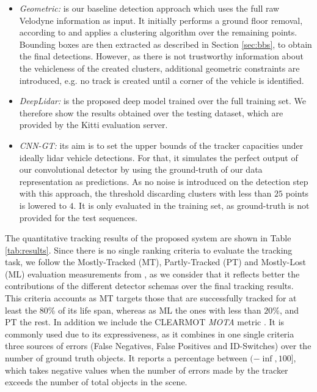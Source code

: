 \documentclass[letterpaper, 10 pt, conference]{ieeeconf}  %
\begin{document}
\begin{itemize}
\item \textit{Geometric:} is our baseline detection approach which uses the full raw Velodyne information as input. It initially performs a ground floor removal, according to \cite{petrovskaya2009model} and applies a clustering algorithm over the remaining points. Bounding boxes are then extracted as described in Section \ref{sec:bbs}, to obtain the final detections. However, as there is not trustworthy information about the vehicleness of the created clusters, additional geometric constraints are introduced, e.g. no track is created until a corner of the vehicle is identified.

\item \textit{DeepLidar:} is the proposed deep model trained over the full training set. We therefore show the results obtained over the testing dataset, which are provided by the Kitti evaluation server. 

\item \textit{CNN-GT:} its aim is to set the upper bounds of the tracker capacities under ideally lidar vehicle detections. For that, it simulates the perfect output of our convolutional detector by using the ground-truth of our data representation as predictions. As no noise is introduced on the detection step with this approach, the threshold discarding clusters with less than $25$ points is lowered to $4$. It is only evaluated in the training set, as ground-truth is not provided for the test sequences. 
\end{itemize}

The quantitative tracking results of the proposed system are shown in Table \ref{tab:results}. 
Since there is no single ranking criteria to evaluate the tracking task, we follow the Mostly-Tracked (MT), Partly-Tracked (PT) and Mostly-Lost (ML) evaluation measurements from \cite{li2009learning}, as we consider that it reflects better the contributions of the different detector schemas over the final tracking results. This criteria accounts as MT targets those that are successfully tracked for at least the $80\%$ of its life span, whereas as ML the ones with less than $20\%$, and PT the rest.
%
In addition we include the CLEARMOT \textit{MOTA} metric \cite{bernardin2008evaluating}. It is commonly used due to its expressiveness, as it combines in one single criteria three sources of errors (False Negatives, False Positives and ID-Switches) over the number of ground truth objects. It reports a percentage between $(-\inf,100]$, which takes negative values when the number of errors made by the tracker exceeds the number of total objects in the scene.
\end{document}
